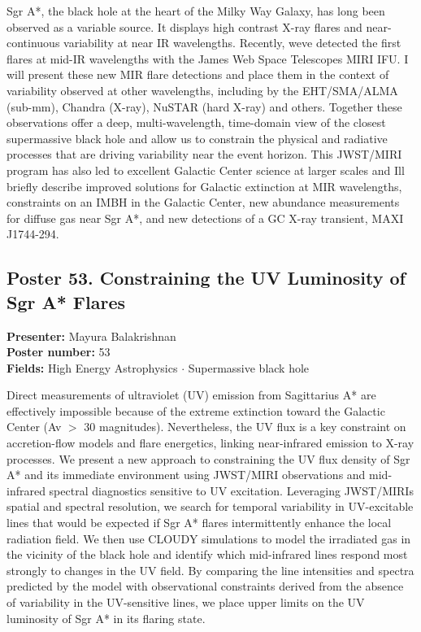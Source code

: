Sgr A*, the black hole at the heart of the Milky Way Galaxy, has long been observed as a variable source. It displays high contrast X-ray flares and near-continuous variability at near IR wavelengths. Recently, weve detected the first flares at mid-IR wavelengths with the James Web Space Telescopes MIRI IFU. I will present these new MIR flare detections and place them in the context of variability observed at other wavelengths, including by the EHT/SMA/ALMA (sub-mm), Chandra (X-ray), NuSTAR (hard X-ray) and others. Together these observations offer a deep, multi-wavelength, time-domain view of the closest supermassive black hole and allow us to constrain the physical and radiative processes that are driving variability near the event horizon. This JWST/MIRI program has also led to excellent Galactic Center science at larger scales and Ill briefly describe improved solutions for Galactic extinction at MIR wavelengths, constraints on an IMBH in the Galactic Center, new abundance measurements for diffuse gas near Sgr A*, and new detections of a GC X-ray transient, MAXI J1744-294.

\hypertarget{poster-abstract-talk-123}{}\label{poster-abstract-page-talk-123}
\subsection*{Poster 53. Constraining the UV Luminosity of Sgr A* Flares}
\textbf{Presenter:} Mayura Balakrishnan\\
\textbf{Poster number:} 53\\
\textbf{Fields:} High Energy Astrophysics $\cdot$ Supermassive black hole

Direct measurements of ultraviolet (UV) emission from Sagittarius A* are effectively impossible because of the extreme extinction toward the Galactic Center (Av $>$ 30 magnitudes). Nevertheless, the UV flux is a key constraint on accretion-flow models and flare energetics, linking near-infrared emission to X-ray processes. We present a new approach to constraining the UV flux density of Sgr A* and its immediate environment using JWST/MIRI observations and mid-infrared spectral diagnostics sensitive to UV excitation. Leveraging JWST/MIRIs spatial and spectral resolution, we search for temporal variability in UV-excitable lines that would be expected if Sgr A* flares intermittently enhance the local radiation field. We then use CLOUDY simulations to model the irradiated gas in the vicinity of the black hole and identify which mid-infrared lines respond most strongly to changes in the UV field. By comparing the line intensities and spectra predicted by the model with observational constraints derived from the absence of variability in the UV-sensitive lines, we place upper limits on the UV luminosity of Sgr A* in its flaring state.

